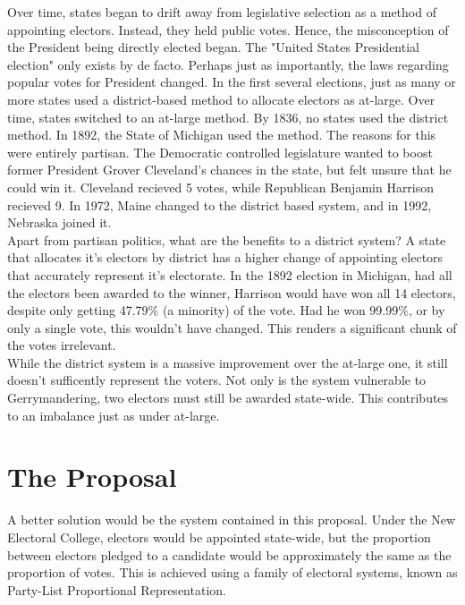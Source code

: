 \documentclass{article}
\begin{document}
    Over time, states began to drift away from legislative selection as a method of appointing electors. Instead, they held public votes. Hence, the misconception of the President being directly elected began. The "United States Presidential election" only exists by de facto. Perhaps just as importantly, the laws regarding popular votes for President changed. In the first several elections, just as many or more states used a district-based method to allocate electors as at-large. Over time, states switched to an at-large method. By 1836, no states used the district method. In 1892, the State of Michigan used the method. The reasons for this were entirely partisan. The Democratic controlled legislature wanted to boost former President Grover Cleveland's chances in the state, but felt unsure that he could win it. Cleveland recieved 5 votes, while Republican Benjamin Harrison recieved 9. In 1972, Maine changed to the district based system, and in 1992, Nebraska joined it. \\

    Apart from partisan politics, what are the benefits to a district system? A state that allocates it's electors by district has a higher change of appointing electors that accurately represent it's electorate. In the 1892 election in Michigan, had all the electors been awarded to the winner, Harrison would have won all 14 electors, despite only getting 47.79\% (a minority) of the vote. Had he won 99.99\%, or by only a single vote, this wouldn't have changed. This renders a significant chunk of the votes irrelevant. \\

    While the district system is a massive improvement over the at-large one, it still doesn't sufficently represent the voters. Not only is the system vulnerable to Gerrymandering, two electors must still be awarded state-wide. This contributes to an imbalance just as under at-large. \\

    \section{The Proposal}%

    A better solution would be the system contained in this proposal. Under the New Electoral College, electors would be appointed state-wide, but the proportion between electors pledged to a candidate would be approximately the same as the proportion of votes. This is achieved using a family of electoral systems, known as Party-List Proportional Representation. \\
\end{document}
